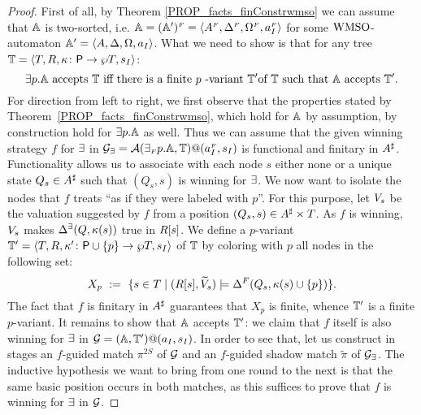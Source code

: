 \begin{proof}
First of all, by Theorem \ref{PROP_facts_finConstrwmso} we can assume that $\mathbb{A}$ is two-sorted, i.e. $\mathbb{A} = (\mathbb{A}')^{{\scriptscriptstyle F}} = \langle{A^{{\scriptscriptstyle F}}, \Delta^{{\scriptscriptstyle F}},\Omega^{{\scriptscriptstyle F}},a_I^{{\scriptscriptstyle F}}}\rangle$ for some $\mathrm{WMSO}$-automaton $\mathbb{A}' = \langle{A,\Delta,\Omega, a_I}\rangle$. What we need to show is that for any tree $\mathbb{T} = \langle{T,R,\kappa\colon \mathsf{P}\to \wp T,s_I}\rangle$:
$${{\exists} p}.\aut \text{ accepts } \bbT \text{ iff } \text{there is a finite }p \text{ -variant }\bbT' \text{of } \bbT \text{  such that } \aut \text{  accepts } \bbT'.$$
For direction from left to right, we first observe that the properties stated by Theorem~\ref{PROP_facts_finConstrwmso}, which hold for $\mathbb{A}$ by assumption, by construction hold for ${{\exists} p}.\mathbb{A}$ as well. Thus we can assume that the given winning strategy $f$ for $\exists$ in $\mathcal{G_{\exists}} = \mathcal{A}({\exists_{{\scriptscriptstyle F}} p}.\mathbb{A},\mathbb{T})@(a_I^{{\scriptscriptstyle F}},s_I)$ is functional and finitary in $A^{\sharp}$. Functionality allows us to associate with each node $s$ either none or a unique state $Q_s \in A^{\sharp}$ such that $(Q_s,s)$ is winning for $\exists$. We now want to isolate the nodes that $f$ treats ``as if they were labeled with $p$''. For this purpose, let $V_{s}$ be the valuation suggested by $f$ from a position $(Q_s,s) \in A^{\sharp} \times T$. As $f$ is winning, $V_{s}$ makes $\Delta^\exists(Q,\kappa(s))$ true in $R[s]$. We define a $p$-variant $\mathbb{T}' = \langle{T,R,\kappa' \colon \mathsf{P}\cup\{p\} \to \wp T,s_I}\rangle$ of $\mathbb{T}$ by coloring with $p$ all nodes in the following set:
 \begin{equation}\label{eq:X_p}
   X_p\ :=\ \{s \in T\mid (\R{s},\widetilde{\val}_{s}) \models \tmap^{\f}(Q_s,\tscolors(s)\cup\{p\})\}.
\end{equation}
The fact that $f$ is finitary in $A^{\sharp}$ guarantees that $X_p$ is finite, whence $\mathbb{T}'$ is a finite $p$-variant. It remains to show that $\mathbb{A}$ accepts $\mathbb{T}'$: we claim that $f$ itself is also winning for $\exists$ in $\mathcal{G} = (\mathbb{A},\mathbb{T}')@(a_I,s_I)$. In order to see that, let us construct in stages an $f$-guided match $\pi^{2S}$ of $\mathcal{G}$ and an $f$-guided shadow match $\tilde{\pi}$ of $\mathcal{G_{\exists}}$. The inductive hypothesis we want to bring from one round to the next is that the same basic position occurs in both matches, as this suffices to prove that $f$ is winning for $\exists$ in $\mathcal{G}$.


\end{proof}
